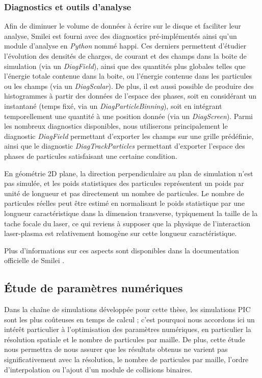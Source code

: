 \begin{refsection}
\subsubsection{Diagnostics et outils d'analyse}

Afin de diminuer le volume de données à écrire sur le disque et faciliter leur analyse, Smilei est fourni avec des diagnostics pré-implémentés ainsi qu'un module d'analyse en \textit{Python} nommé happi. 
Ces derniers permettent d'étudier l'évolution des densités de charges, de courant et des champs dans la boite de simulation (via un \textit{DiagField}), ainsi que des quantités plus globales telles que l'énergie totale contenue dans la boite, ou l'énergie contenue dans les particules ou les champs (via un \textit{DiagScalar}). De plus, il est aussi possible de produire des histogrammes à partir des données de l'espace des phases, soit en considérant un instantané (temps fixé, via un \textit{DiagParticleBinning}), soit en intégrant temporellement une quantité à une position donnée (via un \textit{DiagScreen}).
Parmi les nombreux diagnostics disponibles, nous utiliserons principalement le diagnostic \textit{DiagField} permettant d'exporter les champs sur une grille prédéfinie, ainsi que le diagnostic \textit{DiagTrackParticles} permettant d'exporter l'espace des phases de particules satisfaisant une certaine condition. 

En géométrie 2D plane, la direction perpendiculaire au plan de simulation n'est pas simulée, et les poids statistiques des particules représentent un poids par unité de longueur et pas directement un nombre de particules. Le nombre de particules réelles peut être estimé en normalisant le poids statistique par une longueur caractéristique dans la dimension transverse, typiquement la taille de la tache focale du laser, ce qui reviens à supposer que la physique de l'interaction laser-plasma est relativement homogène sur cette longueur caractéristique.

Plus d'informations sur ces aspects sont disponibles dans la documentation officielle de Smilei \parencite{smilei_web}.

\subsection{Étude de paramètres numériques}

Dans la chaîne de simulations développée pour cette thèse, les simulations PIC sont les plus coûteuses en temps de calcul ; c'est pourquoi nous accordons ici un intérêt particulier à l'optimisation des paramètres numériques, en particulier la résolution spatiale et le nombre de particules par maille. De plus, cette étude nous permettra de nous assurer que les résultats obtenus ne varient pas significativement avec la résolution, le nombre de particules par maille, l'ordre d'interpolation ou l'ajout d'un module de collisions binaires.


\end{refsection}
